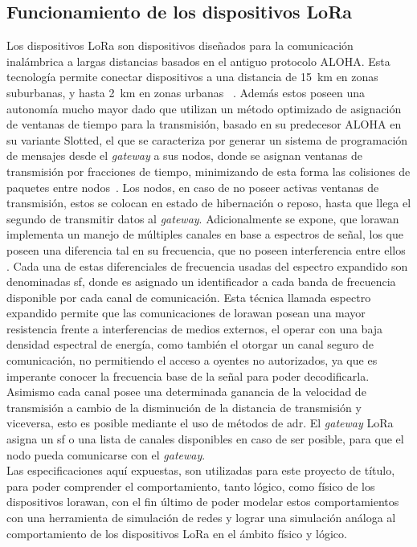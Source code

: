 \begin{justify}
\section{Funcionamiento de los dispositivos LoRa}
Los dispositivos LoRa son dispositivos diseñados para la comunicación inalámbrica a largas distancias basados en el antiguo protocolo ALOHA. Esta tecnología permite conectar dispositivos a una distancia de \SI{15}{\kilo\meter} en zonas suburbanas, y hasta \SI{2}{\kilo\meter} en zonas urbanas \cite{Sornin}~\cite{Sornin2}. Además estos poseen una autonomía mucho mayor dado que utilizan un método optimizado de asignación de ventanas de tiempo para la transmisión, basado en su predecesor ALOHA en su variante Slotted, el que se caracteriza por generar un sistema de programación de mensajes desde el \textit{gateway} a sus nodos, donde se asignan ventanas de transmisión por fracciones de tiempo, minimizando de esta forma las colisiones de paquetes entre nodos~\cite{NORMAN}. Los nodos, en caso de no poseer activas ventanas de transmisión, estos se colocan en estado de hibernación o reposo, hasta que llega el segundo de transmitir datos al \textit{gateway}. Adicionalmente se expone, que \gls{lorawan} implementa un manejo de múltiples canales en base a espectros de señal, los que poseen una diferencia tal en su frecuencia, que no poseen interferencia entre ellos \cite{modulation}. Cada una de estas diferenciales de frecuencia usadas del espectro expandido son denominadas \gls{sf}, donde es asignado un identificador a cada banda de frecuencia disponible por cada canal de comunicación. Esta técnica llamada espectro expandido permite que las comunicaciones de \gls{lorawan} posean una mayor resistencia frente a interferencias de medios externos, el operar con una baja densidad espectral de energía, como también el otorgar un canal seguro de comunicación, no permitiendo el acceso a oyentes no autorizados, ya que es imperante conocer la frecuencia base de la señal para poder decodificarla. Asimismo cada canal posee una determinada ganancia de la velocidad de transmisión a cambio de la disminución de la distancia de transmisión y viceversa, esto es posible mediante el uso de métodos de \gls{adr}. El \textit{gateway} LoRa asigna un \gls{sf} o una lista de canales disponibles en caso de ser posible, para que el nodo pueda comunicarse con el \textit{gateway}.\\
Las especificaciones aquí expuestas, son utilizadas para este proyecto de título, para poder comprender el comportamiento, tanto lógico, como físico de los dispositivos \gls{lorawan}, con el fin último de poder modelar estos comportamientos con una herramienta de simulación de redes y lograr una simulación análoga al comportamiento de los dispositivos LoRa en el ámbito físico y lógico.


\end{justify}
